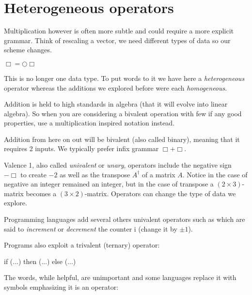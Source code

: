
\section{Heterogeneous operators}
Multiplication however is often more subtle and 
could require a more explicit grammar.  Think of rescaling a vector, we need 
different types of data so our scheme changes.
\begin{center}
    $\Box = \bigcirc \Box$
\end{center}    
This is no longer one data type.  To put words to it we have here a \emph{heterogeneous}
operator whereas the additions we explored before were each \emph{homogeneous}.

Addition is held to high standards in algebra
(that it will evolve into linear algebra).  So when you are considering a bivalent
operation with few if any good properties, use a multiplication inspired
notation instead.   


Addition from here on out will be bivalent (also called binary), meaning 
that it requires 2 inputs.  We typically prefer infix grammar $\Box +\Box$.




 Valence
1, also called \emph{univalent} or \emph{unary}, operators include the negative
sign $-\Box$ to create $-2$ as well as the transpose $A^{\dagger}$ of a matrix
$A$. Notice in the case of negative an integer remained an integer, but in the
case of transpose a $(2\times 3)$-matrix becomes a $(3\times 2)$-matrix.
Operators can change the type of data we explore.
 
Programming languages add several others univalent operators
such as  which are said to \emph{increment} 
or \emph{decrement} the counter i (change it by $\pm 1$).

Programs also exploit a trivalent (ternary) operator:
\begin{center}
\begin{Pcode}[]
if (...) then (...) else (...)
\end{Pcode}
\end{center}
The words, while helpful, are unimportant and some languages
replace it with symbols emphasizing it is an operator:
\begin{center}
\end{center}
